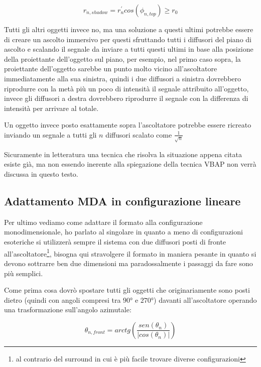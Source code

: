 \documentclass[12pt,a4paper]{report}
\begin{document}
\begin{equation}
r_{n,shadow}=r_n^{\prime} cos(\phi_{n,top}) \geq r_0
\label{zzz}
\end{equation}

Tutti gli altri oggetti invece no, ma una soluzione a questi ultimi potrebbe essere di creare un ascolto immersivo per questi sfruttando tutti i diffusori del piano di ascolto e scalando il segnale da inviare a tutti questi ultimi in base alla posizione della proiettante dell'oggetto sul piano, per esempio, nel primo caso sopra, la proiettante dell'oggetto sarebbe un punto molto vicino all'ascoltatore immediatamente alla sua sinistra, quindi i due diffusori a sinistra dovrebbero riprodurre con la metà più un poco di intensità il segnale attribuito all'oggetto, invece gli diffusori a destra dovrebbero riprodurre il segnale con la differenza di intensità per arrivare al totale.

Un oggetto invece posto esattamente sopra l'ascoltatore potrebbe essere ricreato inviando un segnale a tutti gli $n$ diffusori scalato come $\frac{1}{\sqrt{n}}$

Sicuramente in letteratura una tecnica che risolva la situazione appena citata esiste già, ma non essendo inerente alla spiegazione della tecnica VBAP non verrà discussa in questo testo.

\subsection{Adattamento MDA in configurazione lineare}

Per ultimo vediamo come adattare il formato alla configurazione monodimensionale, ho parlato al singolare in quanto a meno di configurazioni esoteriche si utilizzerà sempre il sistema con due diffusori posti di fronte all'ascoltatore\footnote{al contrario del surround in cui è più facile trovare diverse configurazioni}, bisogna qui stravolgere il formato in maniera pesante in quanto si devono sottrarre ben due dimensioni ma paradossalmente i passaggi da fare sono più semplici.

Come prima cosa dovrò spostare tutti gli oggetti che originariamente sono posti dietro (quindi con angoli compresi tra $90°$ e $270°$) davanti all'ascoltatore operando una trasformazione sull'angolo azimutale:

\begin{equation}
\theta_{n,front} = arctg  \left( \dfrac{sen(\theta_n)}{\vert cos(\theta_n)\vert } \right)
\label{llll}
\end{equation}
\end{document}
